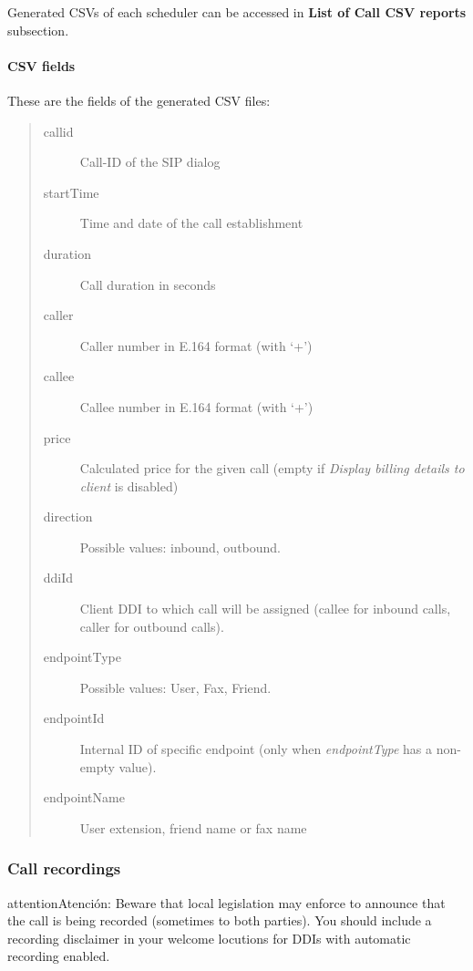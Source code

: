 \documentclass[letterpaper,10pt,spanish]{sphinxmanual}
\begin{document}
Generated CSVs of each scheduler can be accessed in \textbf{List of Call CSV reports} subsection.


\paragraph{CSV fields}
\label{administration_portal/client/vpbx/calls/call_csv_schedulers:csv-fields}
These are the fields of the generated CSV files:
\begin{quote}
\begin{description}
\item[{callid}] \leavevmode
Call-ID of the SIP dialog

\item[{startTime}] \leavevmode
Time and date of the call establishment

\item[{duration}] \leavevmode
Call duration in seconds

\item[{caller}] \leavevmode
Caller number in E.164 format (with `+')

\item[{callee}] \leavevmode
Callee number in E.164 format (with `+')

\item[{price}] \leavevmode
Calculated price for the given call (empty if \emph{Display billing details to client} is disabled)

\item[{direction}] \leavevmode
Possible values: inbound, outbound.

\item[{ddiId}] \leavevmode
Client DDI to which call will be assigned (callee for inbound calls, caller for outbound calls).

\item[{endpointType}] \leavevmode
Possible values: User, Fax, Friend.

\item[{endpointId}] \leavevmode
Internal ID of specific endpoint (only when \emph{endpointType} has a non-empty value).

\item[{endpointName}] \leavevmode
User extension, friend name or fax name

\end{description}
\end{quote}


\subsubsection{Call recordings}
\label{administration_portal/client/vpbx/calls/call_recordings::doc}\label{administration_portal/client/vpbx/calls/call_recordings:call-recordings}\label{administration_portal/client/vpbx/calls/call_recordings:id1}
\begin{notice}{attention}{Atención:}
Beware that local legislation may enforce to announce that the
call is being recorded (sometimes to both parties). You should include
a recording disclaimer in your welcome locutions for DDIs with automatic
recording enabled.
\end{notice}
\end{document}
